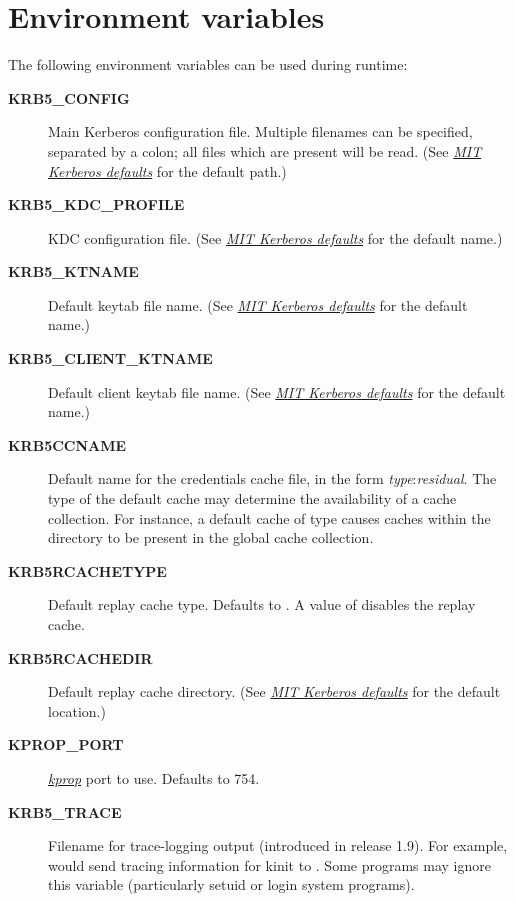 \documentclass[letterpaper,10pt,english]{sphinxmanual}
\begin{document}
\chapter{Environment variables}
\label{admin/env_variables:environment-variables}\label{admin/env_variables::doc}
The following environment variables can be used during runtime:
\begin{description}
\item[{\textbf{KRB5\_CONFIG}}] \leavevmode
Main Kerberos configuration file.  Multiple filenames can be
specified, separated by a colon; all files which are present will
be read.  (See {\hyperref[mitK5defaults:mitk5defaults]{\emph{MIT Kerberos defaults}}} for the default path.)

\item[{\textbf{KRB5\_KDC\_PROFILE}}] \leavevmode
KDC configuration file.  (See {\hyperref[mitK5defaults:mitk5defaults]{\emph{MIT Kerberos defaults}}} for the default
name.)

\item[{\textbf{KRB5\_KTNAME}}] \leavevmode
Default keytab file name.  (See {\hyperref[mitK5defaults:mitk5defaults]{\emph{MIT Kerberos defaults}}} for the
default name.)

\item[{\textbf{KRB5\_CLIENT\_KTNAME}}] \leavevmode
Default client keytab file name.  (See {\hyperref[mitK5defaults:mitk5defaults]{\emph{MIT Kerberos defaults}}} for
the default name.)

\item[{\textbf{KRB5CCNAME}}] \leavevmode
Default name for the credentials cache file, in the form \emph{type}:\emph{residual}.  The type of the default cache may determine the
availability of a cache collection.  For instance, a default cache
of type  causes caches within the directory to be present
in the global cache collection.

\item[{\textbf{KRB5RCACHETYPE}}] \leavevmode
Default replay cache type.  Defaults to .  A value of
 disables the replay cache.

\item[{\textbf{KRB5RCACHEDIR}}] \leavevmode
Default replay cache directory.  (See {\hyperref[mitK5defaults:mitk5defaults]{\emph{MIT Kerberos defaults}}} for the
default location.)

\item[{\textbf{KPROP\_PORT}}] \leavevmode
{\hyperref[admin/admin_commands/kprop:kprop-8]{\emph{kprop}}} port to use.  Defaults to 754.

\item[{\textbf{KRB5\_TRACE}}] \leavevmode
Filename for trace-logging output (introduced in release 1.9).
For example,  would send
tracing information for kinit to .  Some programs
may ignore this variable (particularly setuid or login system
programs).

\end{description}
\end{document}
